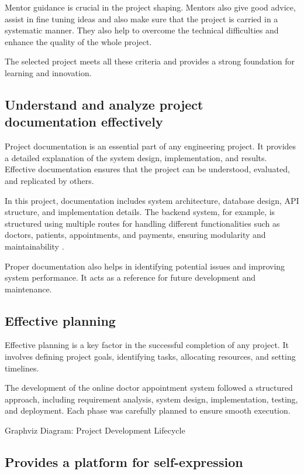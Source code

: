 Mentor guidance is crucial in the project shaping. Mentors also give good advice, assist in fine tuning ideas and also make sure that the project is carried in a systematic manner. They also help to overcome the technical difficulties and enhance the quality of the whole project.

The selected project meets all these criteria and provides a strong foundation for learning and innovation.

\subsection{Understand and analyze project documentation effectively}

Project documentation is an essential part of any engineering project. It provides a detailed explanation of the system design, implementation, and results. Effective documentation ensures that the project can be understood, evaluated, and replicated by others.

In this project, documentation includes system architecture, database design, API structure, and implementation details. The backend system, for example, is structured using multiple routes for handling different functionalities such as doctors, patients, appointments, and payments, ensuring modularity and maintainability .

Proper documentation also helps in identifying potential issues and improving system performance. It acts as a reference for future development and maintenance.

\subsection{Effective planning}

Effective planning is a key factor in the successful completion of any project. It involves defining project goals, identifying tasks, allocating resources, and setting timelines.

The development of the online doctor appointment system followed a structured approach, including requirement analysis, system design, implementation, testing, and deployment. Each phase was carefully planned to ensure smooth execution.

Graphviz Diagram: Project Development Lifecycle

\subsection{Provides a platform for self-expression}

